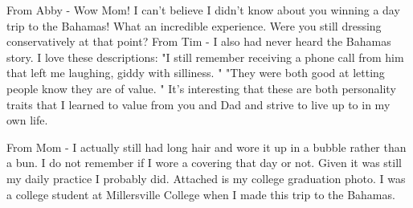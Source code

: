 From Abby - Wow Mom! I can't believe I didn't know about you winning a day trip to the Bahamas! What an incredible experience.
Were you still dressing conservatively at that point?
From Tim - I also had never heard the Bahamas story.
I love these descriptions:
"I still remember receiving a phone call from him that left me laughing, giddy with silliness.
"
"They were both good at letting people know they are of value.
"
It's interesting that these are both personality traits that I learned to value from you and Dad and strive to live up to in my own life.

From Mom - I actually still had long hair and wore it up in a bubble rather than a bun.
I do not remember if I wore a covering that day or not.
Given it was still my daily practice I probably did.
Attached is my college graduation photo.
I was a college student at Millersville College when I made this trip to the Bahamas.






